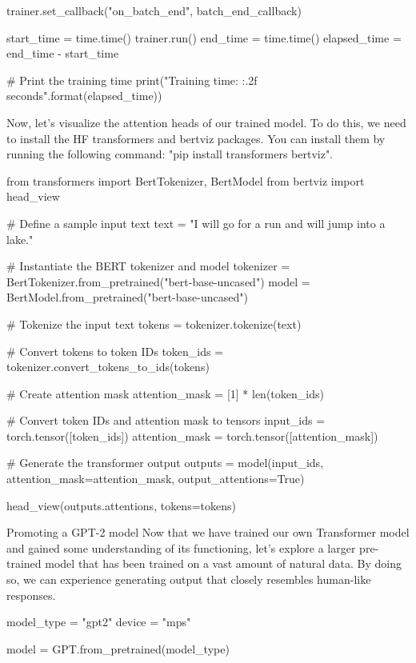 \begin{exercise}
\begin{python}
trainer.set_callback("on_batch_end", batch_end_callback)

start_time = time.time()
trainer.run()
end_time = time.time()
elapsed_time = end_time - start_time

# Print the training time
print("Training time: {:.2f} seconds".format(elapsed_time))
\end{python}

Now, let's visualize the attention heads of our trained model. To do this, we need to install the HF transformers and bertviz packages. You can install them by running the following command: "pip install transformers bertviz".


\begin{python}
from transformers import BertTokenizer, BertModel
from bertviz import head_view

# Define a sample input text
text = "I will go for a run and will jump into a lake."

# Instantiate the BERT tokenizer and model
tokenizer = BertTokenizer.from_pretrained("bert-base-uncased")
model = BertModel.from_pretrained("bert-base-uncased")

# Tokenize the input text
tokens = tokenizer.tokenize(text)

# Convert tokens to token IDs
token_ids = tokenizer.convert_tokens_to_ids(tokens)

# Create attention mask
attention_mask = [1] * len(token_ids)

# Convert token IDs and attention mask to tensors
input_ids = torch.tensor([token_ids])
attention_mask = torch.tensor([attention_mask])

# Generate the transformer output
outputs = model(input_ids, attention_mask=attention_mask, output_attentions=True)

head_view(outputs.attentions, tokens=tokens)
\end{python}



\begin{exercise} Promoting a GPT-2 model
Now that we have trained our own Transformer model and gained some understanding of its functioning, let's explore a larger pre-trained model that has been trained on a vast amount of natural data. By doing so, we can experience generating output that closely resembles human-like responses.

\begin{python}
model_type = "gpt2"
device = "mps"

model = GPT.from_pretrained(model_type)


\end{python}
\end{exercise}
\end{exercise}

